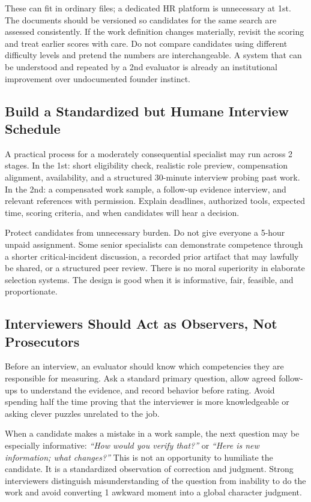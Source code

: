 These can fit in ordinary files; a dedicated HR platform is unnecessary at 1st. The documents should be versioned so candidates for the same search are assessed consistently. If the work definition changes materially, revisit the scoring and treat earlier scores with care. Do not compare candidates using different difficulty levels and pretend the numbers are interchangeable. A system that can be understood and repeated by a 2nd evaluator is already an institutional improvement over undocumented founder instinct.

\subsection{Build a Standardized but Humane Interview Schedule}
\label{sec:interview_schedule}

A practical process for a moderately consequential specialist may run across 2 stages. In the 1st: short eligibility check, realistic role preview, compensation alignment, availability, and a structured 30-minute interview probing past work. In the 2nd: a compensated work sample, a follow-up evidence interview, and relevant references with permission. Explain deadlines, authorized tools, expected time, scoring criteria, and when candidates will hear a decision.

Protect candidates from unnecessary burden. Do not give everyone a 5-hour unpaid assignment. Some senior specialists can demonstrate competence through a shorter critical-incident discussion, a recorded prior artifact that may lawfully be shared, or a structured peer review. There is no moral superiority in elaborate selection systems. The design is good when it is informative, fair, feasible, and proportionate.

\subsection{Interviewers Should Act as Observers, Not Prosecutors}
\label{sec:observers_not_prosecutors}

Before an interview, an evaluator should know which competencies they are responsible for measuring. Ask a standard primary question, allow agreed follow-ups to understand the evidence, and record behavior before rating. Avoid spending half the time proving that the interviewer is more knowledgeable or asking clever puzzles unrelated to the job.

When a candidate makes a mistake in a work sample, the next question may be especially informative: \textit{``How would you verify that?''} or \textit{``Here is new information; what changes?''} This is not an opportunity to humiliate the candidate. It is a standardized observation of correction and judgment. Strong interviewers distinguish misunderstanding of the question from inability to do the work and avoid converting 1 awkward moment into a global character judgment.

